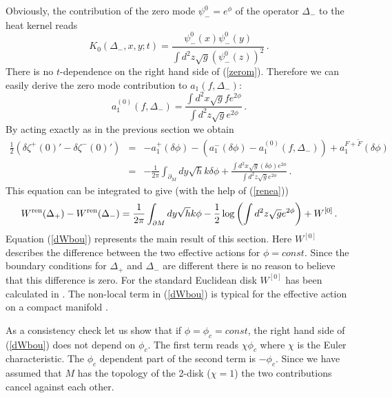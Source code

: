 \documentclass[a4paper,12pt]{article}
\begin{document}
Obviously, the contribution of the zero mode $\psi^0_-=e^\phi$ of the
operator $\Delta_-$ to the heat kernel reads
\begin{equation}
K_0(\Delta_-,x,y;t) =\frac{\psi^0_-(x)\psi^0_-(y) }{\int d^2z\sqrt{g}
(\psi^0_-(z))^2 } \,.
\label{zerom}
\end{equation}
There is no $t$-dependence on the right hand side of (\ref{zerom}).
Therefore we can easily derive the zero mode contribution to
$a_1(f,\Delta_-)$:
\begin{equation}
a_1^{(0)}(f,\Delta_-)=\frac{\int d^2 x\sqrt{g} f e^{2\phi}}{\int d^2z
\sqrt{g}e^{2\phi}} \,. \label{a1zero}
\end{equation}
By acting exactly as in the previous section we obtain
\begin{eqnarray}
\frac 12 \left( \delta\zeta^+(0)'-\delta\zeta^-(0)'\right)
&=&-a_1^+(\delta\phi )
-(a_1^-(\delta\phi )-a_1^{(0)}(f,\Delta_-)) +a_1^{F+\tilde F}(\delta\phi ) 
\nonumber \\
&=&-\frac 1{2\pi} \int_{\partial_M} dy\sqrt{h} k\delta\phi +
\frac{\int d^2 x\sqrt{g} (\delta\phi ) e^{2\phi}}{\int d^2z
\sqrt{g}e^{2\phi}}\,.
\end{eqnarray}
This equation can be integrated to give (with the help of (\ref{renea}))
\begin{equation}
W^{\mbox{\scriptsize ren}}(\Delta_+)-
W^{\mbox{\scriptsize ren}}(\Delta_-)=\frac 1{2\pi }
\int_{\partial M} dy\sqrt{h}  k\phi -
\frac 12 \log \left( \int d^2z
\sqrt{g}e^{2\phi} \right) +W^{[0]} \,. \label{dWbou}
\end{equation}
Equation (\ref{dWbou}) represents the main result of this section.
Here $W^{[0]}$ describes the difference between the two effective
actions for $\phi =const.$ Since the boundary conditions for
$\Delta_+$ and $\Delta_-$ are different there is no reason
to believe that this difference is zero. For the standard
Euclidean disk $W^{[0]}$ has been calculated in 
\cite{Bordag:1996zc,Dowker:1996bh}. The non-local term
in (\ref{dWbou}) is typical for the effective action
on a compact manifold \cite{Dowker:1994rt}.

As a consistency check
let us show that if $\phi =\phi_c =const$, the right hand side
of (\ref{dWbou}) does not depend on $\phi_c$. The first term
reads $ \chi\phi_c$ where $\chi$ is the Euler
characteristic. The $\phi_c$ dependent part of the second
term is $-\phi_c$. Since we have assumed that $M$
has the topology of the 2-disk ($\chi =1$)  the two contributions
cancel against each other.
\end{document}
